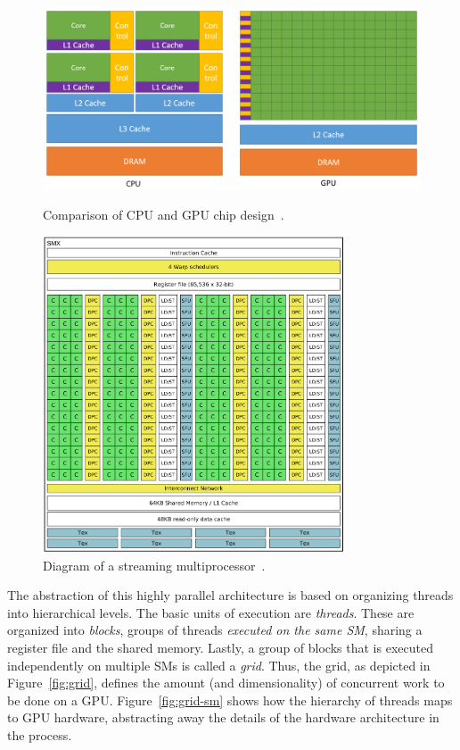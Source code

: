 \begin{figure}[h]
	\centering
	\begin{minipage}{.5\textwidth}
        \centering
        \includegraphics[width=\textwidth]{img/cpu-gpu}
        \caption{Comparison of CPU and GPU chip design~\cite{site:cuda}.}
        \label{fig:cpu-gpu}
	\end{minipage}%
	\begin{minipage}{.5\textwidth}
        \centering
        \includegraphics[width=0.8\textwidth]{img/sm}
        \caption{Diagram of a streaming multiprocessor~\cite{navarro2014survey}.}
        \label{fig:sm}
	\end{minipage}
\end{figure}

The abstraction of this highly parallel architecture is based on organizing threads into hierarchical levels. The basic units of execution are \emph{threads}. These are organized into \emph{blocks}, groups of threads \emph{executed on the same SM}, sharing a register file and the shared memory. Lastly, a group of blocks that is executed independently on multiple SMs is called a \emph{grid}. Thus, the grid, as depicted in Figure~\ref{fig:grid}, defines the amount (and dimensionality) of concurrent work to be done on a GPU. Figure~\ref{fig:grid-sm} shows how the hierarchy of threads maps to GPU hardware, abstracting away the details of the hardware architecture in the process.

